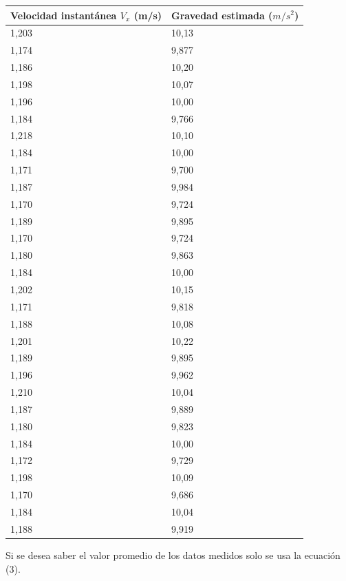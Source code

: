\documentclass[a4paper]{article}
\begin{document}
\begin{table}[H]
    \centering
    \begin{tabular}{|l|l|}
    \hline
        Velocidad instantánea $V_x$ (m/s)  & Gravedad estimada ($m/s^2$)  \\ \hline
        1,203  & 10,13  \\ \hline
        1,174  & 9,877  \\ \hline
        1,186  & 10,20  \\ \hline
        1,198  & 10,07  \\ \hline
        1,196  & 10,00  \\ \hline
        1,184  & 9,766  \\ \hline
        1,218  & 10,10  \\ \hline
        1,184  & 10,00  \\ \hline
        1,171  & 9,700  \\ \hline
        1,187  & 9,984  \\ \hline
        1,170  & 9,724  \\ \hline
        1,189  & 9,895  \\ \hline
        1,170  & 9,724  \\ \hline
        1,180  & 9,863  \\ \hline
        1,184  & 10,00  \\ \hline
        1,202  & 10,15  \\ \hline
        1,171  & 9,818  \\ \hline
        1,188  & 10,08  \\ \hline
        1,201  & 10,22  \\ \hline
        1,189  & 9,895  \\ \hline
        1,196  & 9,962  \\ \hline
        1,210  & 10,04  \\ \hline
        1,187  & 9,889  \\ \hline
        1,180  & 9,823  \\ \hline
        1,184  & 10,00  \\ \hline
        1,172  & 9,729  \\ \hline
        1,198  & 10,09  \\ \hline
        1,170  & 9,686  \\ \hline
        1,184  & 10,04  \\ \hline
        1,188  & 9,919  \\ \hline
        \end{tabular}
\end{table}

Si se desea saber el valor promedio de los datos medidos solo se usa la ecuación (3). 
\end{document}
